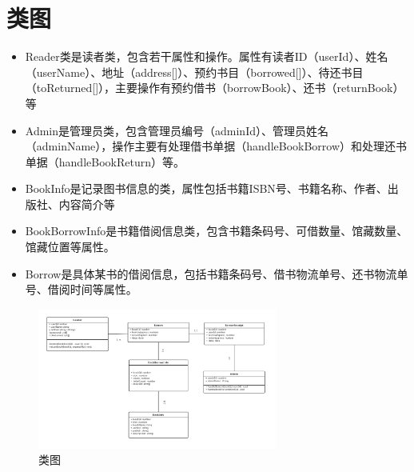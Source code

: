 \section{类图}
\begin{itemize}
    \item Reader类是读者类，包含若干属性和操作。属性有读者ID（userId）、姓名（userName）、地址（address[]）、预约书目（borrowed[]）、待还书目（toReturned[]），主要操作有预约借书（borrowBook）、还书（returnBook）等
    \item Admin是管理员类，包含管理员编号（adminId）、管理员姓名（adminName），操作主要有处理借书单据（handleBookBorrow）和处理还书单据（handleBookReturn）等。
    \item BookInfo是记录图书信息的类，属性包括书籍ISBN号、书籍名称、作者、出版社、内容简介等
    \item BookBorrowInfo是书籍借阅信息类，包含书籍条码号、可借数量、馆藏数量、馆藏位置等属性。
    \item Borrow是具体某书的借阅信息，包括书籍条码号、借书物流单号、还书物流单号、借阅时间等属性。
\end{itemize}
\begin{figure}[H]
    \centering
    \includegraphics[width=0.7\textwidth]{./Chapters/images/class_diagram.png} %
    \caption{类图} %
    \label{类图} %
\end{figure}
